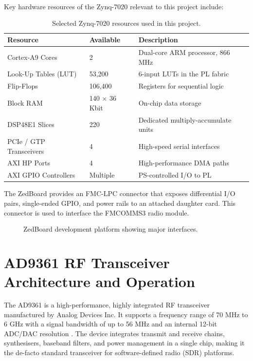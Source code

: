 \documentclass[12pt, a4paper, oneside]{report}
\begin{document}
Key hardware resources of the Zynq-7020 relevant to this project include:

\begin{table}[H]
  \centering
  \caption{Selected Zynq-7020 resources used in this project.}
  \label{tab:zynq_resources}
  \begin{tabular}{lll}
    \toprule
    \textbf{Resource} & \textbf{Available} & \textbf{Description} \\
    \midrule
    Cortex-A9 Cores      & 2        & Dual-core ARM processor, 866 MHz \\
    Look-Up Tables (LUT) & 53,200   & 6-input LUTs in the PL fabric \\
    Flip-Flops           & 106,400  & Registers for sequential logic \\
    Block RAM            & 140 $\times$ 36 Kbit & On-chip data storage \\
    DSP48E1 Slices       & 220      & Dedicated multiply-accumulate units \\
    PCIe / GTP Transceivers & 4    & High-speed serial interfaces \\
    AXI HP Ports         & 4        & High-performance DMA paths \\
    AXI GPIO Controllers & Multiple & PS-controlled I/O to PL \\
    \bottomrule
  \end{tabular}
\end{table}

The ZedBoard provides an FMC-LPC connector that exposes differential I/O pairs, single-ended GPIO, and power rails to an attached daughter card. This connector is used to interface the FMCOMMS3 radio module.

\begin{figure}[H]
  \centering
  \caption{ZedBoard development platform showing major interfaces.}
  \label{fig:zedboard_photo}
\end{figure}

\section{AD9361 RF Transceiver Architecture and Operation}

The AD9361 is a high-performance, highly integrated RF transceiver manufactured by Analog Devices Inc. It supports a frequency range of 70 MHz to 6 GHz with a signal bandwidth of up to 56 MHz and an internal 12-bit ADC/DAC resolution \cite{ad9361_ref_manual}. The device integrates transmit and receive chains, synthesisers, baseband filters, and power management in a single chip, making it the de-facto standard transceiver for software-defined radio (SDR) platforms.
\end{document}
